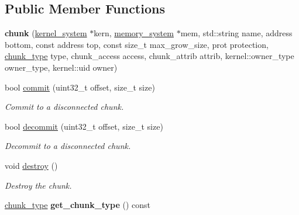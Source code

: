 \subsection*{Public Member Functions}
\begin{DoxyCompactItemize}
\item 
\mbox{\label{classeka2l1_1_1kernel_1_1chunk_a19c43080136dfcfe6cc5c7c4e60070da}} 
{\bfseries chunk} (\mbox{\hyperlink{classeka2l1_1_1kernel__system}{kernel\+\_\+system}} $\ast$kern, \mbox{\hyperlink{classeka2l1_1_1memory__system}{memory\+\_\+system}} $\ast$mem, std\+::string name, address bottom, const address top, const size\+\_\+t max\+\_\+grow\+\_\+size, prot protection, \mbox{\hyperlink{namespaceeka2l1_1_1kernel_aee9c57d72d8825de61cb11d4396438ed}{chunk\+\_\+type}} type, chunk\+\_\+access access, chunk\+\_\+attrib attrib, kernel\+::owner\+\_\+type owner\+\_\+type, kernel\+::uid owner)
\item 
bool \mbox{\hyperlink{classeka2l1_1_1kernel_1_1chunk_ae9476aa5bdec25de98e9d097fc0b9440}{commit}} (uint32\+\_\+t offset, size\+\_\+t size)
\begin{DoxyCompactList}\small\item\em Commit to a disconnected chunk. \end{DoxyCompactList}\item 
bool \mbox{\hyperlink{classeka2l1_1_1kernel_1_1chunk_a4d3ca523dd234163473a5041de63ab78}{decommit}} (uint32\+\_\+t offset, size\+\_\+t size)
\begin{DoxyCompactList}\small\item\em Decommit to a disconnected chunk. \end{DoxyCompactList}\item 
\mbox{\label{classeka2l1_1_1kernel_1_1chunk_a37df47965e05073136fb8bf324949337}} 
void \mbox{\hyperlink{classeka2l1_1_1kernel_1_1chunk_a37df47965e05073136fb8bf324949337}{destroy}} ()
\begin{DoxyCompactList}\small\item\em Destroy the chunk. \end{DoxyCompactList}\item 
\mbox{\label{classeka2l1_1_1kernel_1_1chunk_aabfcea105429c1b58bb28d134d4be6cc}} 
\mbox{\hyperlink{namespaceeka2l1_1_1kernel_aee9c57d72d8825de61cb11d4396438ed}{chunk\+\_\+type}} {\bfseries get\+\_\+chunk\+\_\+type} () const

\end{DoxyCompactItemize}
